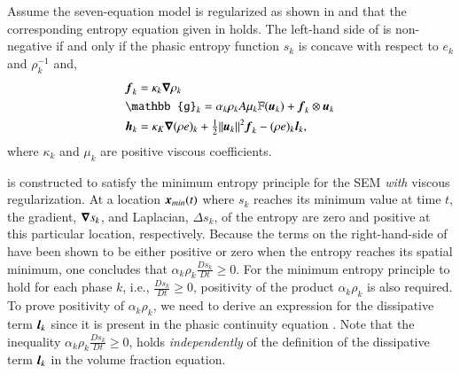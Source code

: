 \begin{lemma}\label{lmm:lemma-1}
Assume the seven-equation model is regularized as shown in  and that the corresponding entropy equation given in  holds.
The left-hand side of  is non-negative if and only if the phasic entropy function $s_k$ is concave with respect to $e_k$ and $\rho_k^{-1}$ and, 
\begin{align}
& \mbold f_k   =  \kappa_k \grad \rho_k
  \\
&  \mathbb{g}_k = \alpha_k \rho_k A \mu_k \mathbb{F}(\mbold u_k) +  \mbold f_k \otimes \mbold u_k
  \\
&  \mbold h_k =   \kappa_K \grad (\rho e)_k + \tfrac{1}{2}\| \mbold u_k\|^2  \mbold f_k - (\rho e)_k \mbold l_k,
\end{align}
where $\kappa_k$ and $\mu_k$ are positive viscous coefficients.
\end{lemma}

 is constructed to satisfy the minimum entropy principle for the SEM \emph{with} viscous regularization. 
At a location $\boldsymbol x_{min}(t)$ where $s_k$ reaches its minimum value at time $t$, the gradient, $\boldsymbol\nabla s_k$, and Laplacian, $\Delta s_k$, 
of the entropy are zero and positive at this particular location, respectively. Because the terms on the right-hand-side of 
 have been shown to be either positive or zero when 
the entropy reaches its spatial minimum, one concludes that $\alpha_k \rho_k \frac{D s_k}{Dt} \geq 0$. For the minimum entropy principle to hold for each phase $k$, i.e., $\frac{D s_k}{Dt}\geq 0$, positivity of the product $\alpha_k \rho_k$ is also required. To prove positivity of $\alpha_k \rho_k$, we need to derive an expression for the dissipative term $\boldsymbol l_k$ since it is present in the phasic continuity equation . Note that the inequality $\alpha_k \rho_k \frac{D s_k}{Dt} \geq 0$, holds {\it independently} of the definition of the dissipative term $\boldsymbol l_k$
in the volume fraction equation.
%
